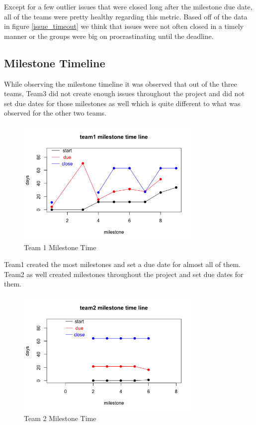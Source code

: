\documentclass[conference]{IEEEtran}
\begin{document}
Except for a few outlier issues that were closed long after the milestone due date, all of the teams were pretty healthy regarding this metric. Based off of the data in figure \ref{issue_timeout} we think that issues were not often closed in a timely manner or the groups were big on procrastinating until the deadline. 

\subsection{Milestone Timeline}
While observing the milestone timeline it was observed that out of the three teams, Team3 did not create enough issues throughout the project and did not set due dates for those milestones as well which is quite different to what was observed for the other two teams. 


\begin{figure}[H]
    \centering
    \includegraphics[width=9cm]{../AprilProject/pic/team1_milestone_time.png}
    \caption{Team 1 Milestone Time}
    \label{team1_milestone_time}
\end{figure}

Team1 created the most milestones and set a due date for almost all of them. Team2 as well created milestones throughout the project and set due dates for them.



\begin{figure}[H]
    \centering
    \includegraphics[width=9cm]{../AprilProject/pic/team2_milestone_time.png}
    \caption{Team 2 Milestone Time}
    \label{team2_milestone_time}
\end{figure}
\end{document}
